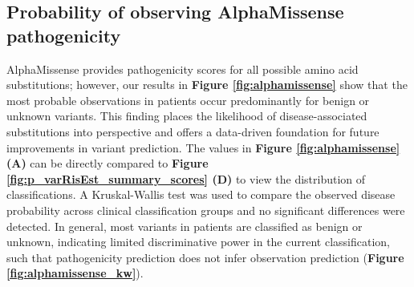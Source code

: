 \FloatBarrier
\subsection{Probability of observing AlphaMissense pathogenicity}
AlphaMissense provides pathogenicity scores for all possible amino acid substitutions; however, our results in \textbf{Figure \ref{fig:alphamissense}} show that the most probable observations in patients occur predominantly for benign or unknown variants. This finding places the likelihood of disease-associated substitutions into perspective and offers a data-driven foundation for future improvements in variant prediction. The values in 
\textbf{Figure \ref{fig:alphamissense} (A)} can be directly compared to 
\textbf{Figure \ref{fig:p_varRisEst_summary_scores} (D)} to view the distribution of classifications.
A Kruskal-Wallis test was used to compare the observed disease probability across clinical classification groups and no significant differences were detected. In general, most variants in patients are classified as benign or unknown, indicating limited discriminative power in the current classification, such that pathogenicity prediction does not infer observation prediction (\textbf{Figure \ref{fig:alphamissense_kw}}).
  

